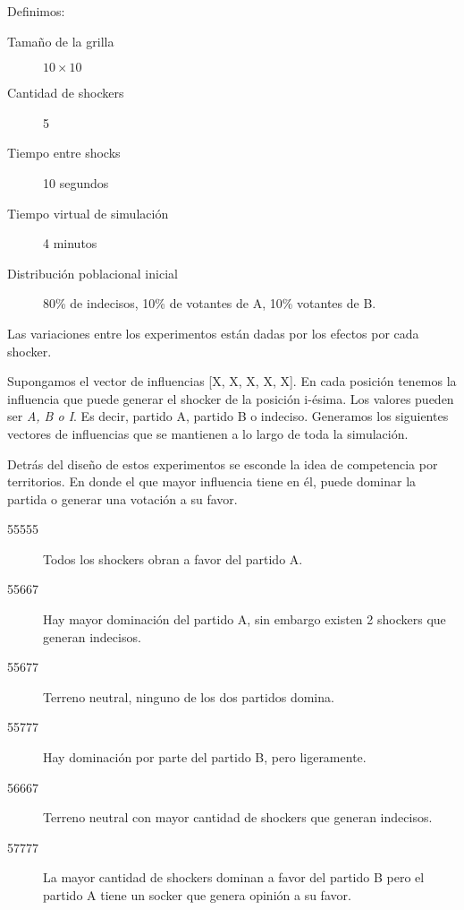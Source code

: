 Definimos:

\begin{description}
    \item[Tamaño de la grilla]  $10 \times 10$
    \item[Cantidad de shockers] 5
    \item[Tiempo entre shocks] 10 segundos
    \item[Tiempo virtual de simulación] 4 minutos
    \item[Distribución poblacional inicial] 80\% de indecisos, 10\% de votantes de A, 10\% votantes de B.
\end{description}

Las variaciones entre los experimentos están dadas por los efectos por cada shocker.

Supongamos el vector de influencias [X, X, X, X, X]. En cada posición tenemos la influencia que puede generar el shocker de la posición i-ésima. Los valores pueden ser \textit{A, B o I}. Es decir, partido A, partido B o indeciso. Generamos los siguientes vectores de influencias que se mantienen a lo largo de toda la simulación.

Detrás del diseño de estos experimentos se esconde la idea de competencia por territorios. En donde el que mayor influencia tiene en él, puede dominar la partida o generar una votación a su favor.

\begin{description}
    \item[55555] Todos los shockers obran a favor del partido A.
    \item[55667] Hay mayor dominación del partido A, sin embargo existen 2 shockers que generan indecisos.
    \item[55677] Terreno neutral, ninguno de los dos partidos domina.
    \item[55777] Hay dominación por parte del partido B, pero ligeramente.
    \item[56667] Terreno neutral con mayor cantidad de shockers que generan indecisos.
    \item[57777] La mayor cantidad de shockers dominan a favor del partido B pero el partido A tiene un socker que genera opinión a su favor.
\end{description}

